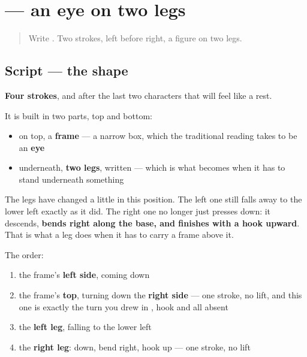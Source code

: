 \section[\texorpdfstring{\zh{见} (jiàn)}{见 (jiàn)}]{ — an eye on two legs}

\label{lesson:ZH-W06-jian}



\begin{quote}
Write . Two strokes, left before right, a figure on two legs.
\end{quote}

\subsection*{Script — the shape}

\begin{quote}
\end{quote}

\textbf{Four strokes}, and after the last two characters that will feel like a rest.

It is built in two parts, top and bottom:

\begin{itemize}
\raggedright
  \item on top, a \textbf{frame} — a narrow box, which the traditional reading takes to be an \textbf{eye}
  \item underneath, \textbf{two legs}, written \textbf{} — which is what  becomes when it has to stand underneath something
\end{itemize}

The legs have changed a little in this position. The left one still falls away to the lower left exactly as it did. The right one no longer just presses down: it descends, \textbf{bends right along the base, and finishes with a hook upward}. That is what a leg does when it has to carry a frame above it.

The order:

\begin{enumerate}
\raggedright
  \item the frame's \textbf{left side}, coming down
  \item the frame's \textbf{top}, turning down the \textbf{right side} — one stroke, no lift, and this one is exactly the turn you drew in , hook and all absent
  \item the \textbf{left leg}, falling to the lower left
  \item the \textbf{right leg}: down, bend right, hook up — one stroke, no lift
\end{enumerate}

